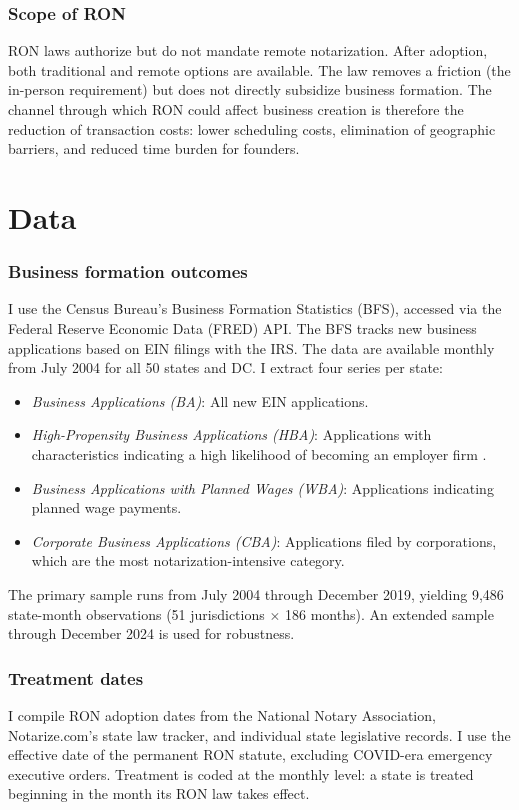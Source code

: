 \documentclass[12pt]{article}
\begin{document}
\subsubsection*{Scope of RON} RON laws authorize but do not mandate remote notarization. After adoption, both traditional and remote options are available. The law removes a friction (the in-person requirement) but does not directly subsidize business formation. The channel through which RON could affect business creation is therefore the reduction of transaction costs: lower scheduling costs, elimination of geographic barriers, and reduced time burden for founders.


\section{Data}

\subsubsection*{Business formation outcomes} I use the Census Bureau's Business Formation Statistics (BFS), accessed via the Federal Reserve Economic Data (FRED) API. The BFS tracks new business applications based on EIN filings with the IRS. The data are available monthly from July 2004 for all 50 states and DC. I extract four series per state:

\begin{itemize}
\item \textit{Business Applications (BA)}: All new EIN applications.
\item \textit{High-Propensity Business Applications (HBA)}: Applications with characteristics indicating a high likelihood of becoming an employer firm \citep{bayard2018}.
\item \textit{Business Applications with Planned Wages (WBA)}: Applications indicating planned wage payments.
\item \textit{Corporate Business Applications (CBA)}: Applications filed by corporations, which are the most notarization-intensive category.
\end{itemize}

The primary sample runs from July 2004 through December 2019, yielding 9,486 state-month observations (51 jurisdictions $\times$ 186 months). An extended sample through December 2024 is used for robustness.

\subsubsection*{Treatment dates} I compile RON adoption dates from the National Notary Association, Notarize.com's state law tracker, and individual state legislative records. I use the effective date of the permanent RON statute, excluding COVID-era emergency executive orders. Treatment is coded at the monthly level: a state is treated beginning in the month its RON law takes effect.
\end{document}
